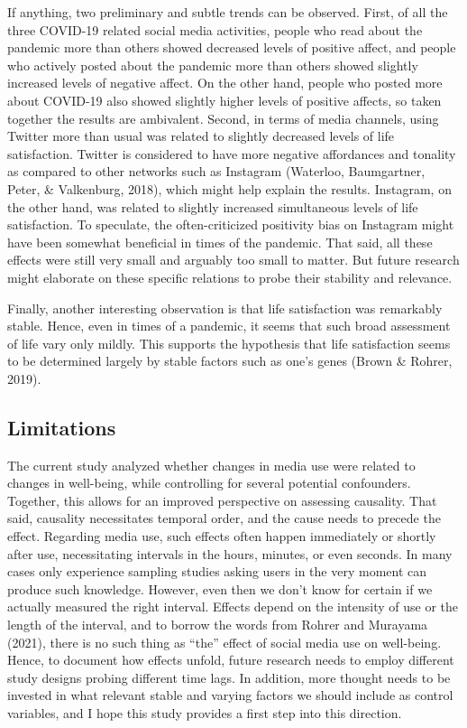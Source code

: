 \documentclass[
  english,
  man,mask,floatsintext]{apa6}
\begin{document}
If anything, two preliminary and subtle trends can be observed.
First, of all the three COVID-19 related social media activities, people who read about the pandemic more than others showed decreased levels of positive affect, and people who actively posted about the pandemic more than others showed slightly increased levels of negative affect.
On the other hand, people who posted more about COVID-19 also showed slightly higher levels of positive affects, so taken together the results are ambivalent.
Second, in terms of media channels, using Twitter more than usual was related to slightly decreased levels of life satisfaction.
Twitter is considered to have more negative affordances and tonality as compared to other networks such as Instagram (Waterloo, Baumgartner, Peter, \& Valkenburg, 2018), which might help explain the results.
Instagram, on the other hand, was related to slightly increased simultaneous levels of life satisfaction.
To speculate, the often-criticized positivity bias on Instagram might have been somewhat beneficial in times of the pandemic.
That said, all these effects were still very small and arguably too small to matter.
But future research might elaborate on these specific relations to probe their stability and relevance.

Finally, another interesting observation is that life satisfaction was remarkably stable.
Hence, even in times of a pandemic, it seems that such broad assessment of life vary only mildly.
This supports the hypothesis that life satisfaction seems to be determined largely by stable factors such as one's genes (Brown \& Rohrer, 2019).

\hypertarget{limitations}{%
\subsection{Limitations}\label{limitations}}

The current study analyzed whether changes in media use were related to changes in well-being, while controlling for several potential confounders.
Together, this allows for an improved perspective on assessing causality.
That said, causality necessitates temporal order, and the cause needs to precede the effect.
Regarding media use, such effects often happen immediately or shortly after use, necessitating intervals in the hours, minutes, or even seconds.
In many cases only experience sampling studies asking users in the very moment can produce such knowledge.
However, even then we don't know for certain if we actually measured the right interval.
Effects depend on the intensity of use or the length of the interval, and to borrow the words from Rohrer and Murayama (2021), there is no such thing as ``the'' effect of social media use on well-being.
Hence, to document how effects unfold, future research needs to employ different study designs probing different time lags.
In addition, more thought needs to be invested in what relevant stable and varying factors we should include as control variables, and I hope this study provides a first step into this direction.
\end{document}
